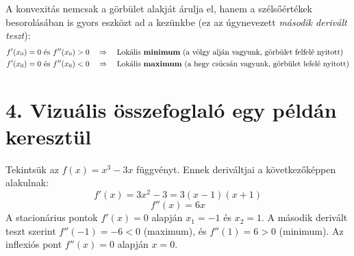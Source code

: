 \documentclass[12pt,a4paper]{article}
\begin{document}
A konvexitás nemcsak a görbület alakját árulja el, hanem a szélsőértékek besorolásában is gyors eszközt ad a kezünkbe (ez az úgynevezett \textit{második derivált teszt}):
\begin{align*}
    f'(x_0) = 0 \text{ és } f''(x_0) > 0 \quad &\Rightarrow \quad \text{Lokális \textbf{minimum} (a völgy alján vagyunk, görbület felfelé nyitott)} \\
    f'(x_0) = 0 \text{ és } f''(x_0) < 0 \quad &\Rightarrow \quad \text{Lokális \textbf{maximum} (a hegy csúcsán vagyunk, görbület lefelé nyitott)}
\end{align*}

\section*{4. Vizuális összefoglaló egy példán keresztül}

Tekintsük az $f(x) = x^3 - 3x$ függvényt. Ennek deriváltjai a következőképpen alakulnak:
\[
    f'(x) = 3x^2 - 3 = 3(x-1)(x+1)
\]
\[
    f''(x) = 6x
\]
A stacionárius pontok $f'(x)=0$ alapján $x_1 = -1$ és $x_2 = 1$. A második derivált teszt szerint $f''(-1) = -6 < 0$ (maximum), és $f''(1) = 6 > 0$ (minimum). Az inflexiós pont $f''(x)=0$ alapján $x = 0$.

\vspace{0.5cm}
\end{document}

